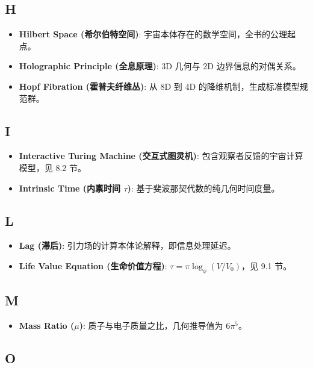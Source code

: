 \subsection{H}

\begin{itemize}
\item \textbf{Hilbert Space (希尔伯特空间)}: 宇宙本体存在的数学空间，全书的公理起点。
\item \textbf{Holographic Principle (全息原理)}: 3D 几何与 2D 边界信息的对偶关系。
\item \textbf{Hopf Fibration (霍普夫纤维丛)}: 从 8D 到 4D 的降维机制，生成标准模型规范群。
\end{itemize}

\subsection{I}

\begin{itemize}
\item \textbf{Interactive Turing Machine (交互式图灵机)}: 包含观察者反馈的宇宙计算模型，见 8.2 节。
\item \textbf{Intrinsic Time (内禀时间 $\tau$)}: 基于斐波那契代数的纯几何时间度量。
\end{itemize}

\subsection{L}

\begin{itemize}
\item \textbf{Lag (滞后)}: 引力场的计算本体论解释，即信息处理延迟。
\item \textbf{Life Value Equation (生命价值方程)}: $\tau = \pi \log_\phi (V/V_0)$，见 9.1 节。
\end{itemize}

\subsection{M}

\begin{itemize}
\item \textbf{Mass Ratio ($\mu$)}: 质子与电子质量之比，几何推导值为 $6\pi^5$。
\end{itemize}

\subsection{O}

